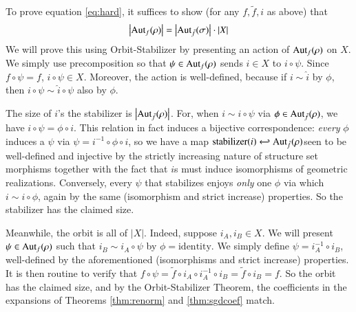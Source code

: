 \documentclass{article}
\theoremstyle{plain}
\theoremstyle{definition}
\newcommand{\wabs}[1]{\left|#1\right|}
\newcommand{\Aut}{\text{\textnormal{Aut}}}
\begin{document}
            To prove equation \ref{eq:hard}, it suffices to show (for any
            $f, \tilde f, i$ as above) that
            $$
                \wabs{\Aut_f(\rho)}
                =
                \wabs{\Aut_{\tilde f}(\sigma)}
                \cdot
                \wabs{X}
            $$
            We will prove this using Orbit-Stabilizer by presenting an
            action of $\Aut_f(\rho)$ on $X$.  We simply use precomposition so
            that $\psi\in \Aut_f(\rho)$ sends $i\in X$ to $i\circ \psi$.  Since
            $f\circ\psi = f$, $i\circ \psi \in X$.  Moreover, the action is
            well-defined, because if $i\sim \hat i$ by $\phi$, then 
            $i \circ \psi \sim \hat i \circ \psi$ also by $\phi$.
            
            The size of $i$'s the stabilizer is $\wabs{\Aut_{\tilde f}(\rho)}$.
            For, when $i \sim i \circ \psi$ via $\phi \in \Aut_{\tilde
            f}(\rho)$, we have $i\circ \psi = \phi \circ i$.  This relation in
            fact induces a bijective correspondence: \emph{every} $\phi$
            induces a $\psi$ via $\psi = i^{-1} \circ \phi \circ i$, so we have
            a map $\text{stabilizer}(i) \hookleftarrow \Aut_{\tilde f}(\rho)
            $seen to be well-defined and injective by the strictly increasing
            nature of structure set morphisms together with the fact that $i$s
            must induce isomorphisms of geometric realizations.  Conversely,
            every $\psi$ that stabilizes enjoys \emph{only} one $\phi$ via
            which $i \sim i \circ \phi$, again by the same (isomorphism and
            strict increase) properties.  So the stabilizer has the claimed
            size.

            Meanwhile, the orbit is all of $\wabs{X}$.  Indeed, suppose
            $i_A, i_B \in X$.  We will present $\psi \in \Aut_f(\rho)$ such
            that $i_B \sim i_A \circ \psi$ by $\phi=\text{identity}$.  We
            simply define $\psi = i_A^{-1} \circ i_B$, well-defined by the
            aforementioned (isomorphisms and strict increase) properties.
            It is then routine to verify that
            $
                f \circ \psi
                =
                \tilde f \circ i_A \circ i_A^{-1} \circ i_B
                =
                \tilde f \circ i_B
                = f.
            $
            So the orbit has the claimed size, and by the Orbit-Stabilizer
            Theorem, the coefficients in the expansions of Theorems 
            \ref{thm:renorm} and \ref{thm:sgdcoef} match.
\end{document}
